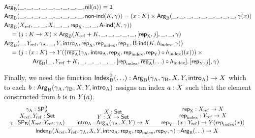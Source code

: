 \documentclass{schwicht}
\begin{document}
\begin{align*} 
&  \mathsf{Arg}_{\mathrm{B}}(\_, \_, \_, \_, \_, \_, \_, \_, \_, \mathsf{nil}(a)) = \mathbf{1} \\
&  \mathsf{Arg}_{\mathrm{B}} (\_, \_, \_, \_, \_, \_, \_, \_, \_, \mathsf{non}\text{-}\mathsf{ind}(K, \gamma)) 
= (x : K) \times \mathsf{Arg}_{\mathrm{B}}(\_, \_, \_, \_, \_, \_, \_, \_, \_, \gamma(x)) \\
&  \mathsf{Arg}_{\mathrm{B}}(X_{\mathrm{ref}}, \_, \_, X, \_, \_, \mathsf{rep}_{\mathrm{X}}, \_, \_, \mathsf{A}\text{-}\mathsf{ind}(K, \gamma)) \\
&\quad=  (j : K \to X) \times \mathsf{Arg}_{\mathrm{B}}(X_{\mathrm{ref}} + K, \_, \_, \_, \_, \_,  [\mathsf{rep}_{\mathrm{X}}, j], \_, \_, \gamma) \\
&  \mathsf{Arg}_{\mathrm{B}}(\_, Y_{\mathrm{ref}}, \gamma_{\mathrm{A}}, \_, Y, \mathsf{intro}_{\mathrm{A}}, \mathsf{rep}_{\mathrm{X}}, \mathsf{rep}_{\mathrm{index}}, \mathsf{rep}_{\mathrm{Y}}, \mathsf{B}\text{-}\mathsf{ind}(K, h_{\mathrm{index}}, \gamma)) \\
&\quad= (j : (x : K) \to Y((\overline{\mathsf{rep}_{\mathrm{A}}}(\gamma_{\mathrm{A}}, \mathsf{intro}_{\mathrm{A}}, \mathsf{rep}_{\mathrm{X}}, \mathsf{rep}_{\mathrm{index}}, \mathsf{rep}_{\mathrm{Y}}) \circ h_{\mathrm{index}})(x))) \times {} \\ 
& \qquad\qquad\ \    \mathsf{Arg}_{\mathrm{B}}(\_, Y_{\mathrm{ref}} + K, \_, \_, \_, \_, \_, [\mathsf{rep}_{\mathrm{index}}, \overline{\mathsf{rep}_{\mathrm{A}}}(\ldots) \circ h_{\mathrm{index}}], [\mathsf{rep}_{\mathrm{Y}}, j], \gamma)
\end{align*}


Finally, we need the function $\mathsf{Index}^{0}_{\mathrm{B}}(\ldots) : \mathsf{Arg}_{\mathrm{B}}(\gamma_{\mathrm{A}}, \gamma_{\mathrm{B}}, X, Y,
\mathsf{intro}_{\mathrm{A}}) \to X$ which to each $b : \mathsf{Arg}_{\mathrm{B}}(\gamma_{\mathrm{A}}, \gamma_{\mathrm{B}}, X, Y,
\mathsf{intro}_{\mathrm{A}})$ assigns an index $a : X$ such that the element constructed
from $b$ is in $Y(a)$.
%
\[
\resizebox{\textwidth}{!}{%
$
\infer{\IndexB(\Xref, \Yref, \gammaA, \A, \B, \introA, \repA, \repIndex, \repB, \gamma) : \ArgB(\ldots) \to \A}
             {\deduce{\gamma : \SPB(\Xref, \Yref, \gammaA)}
                     {\deduce{\Xref, \Yref : \Set}{\gammaA : \SPAp}}
      & \quad \deduce{\introA : \ArgA(\gammaA, \A, \B) \to \A}
                     {\deduce{\B : \A \to \Set}{\A : \Set}}
              & \quad \deduce{\repB: (x : \Yref) \to \B(\repIndex(x))}
                             {\deduce{\repIndex : \Yref \to \A}
                                     {\repA : \Xref \to \A}}}
$
}
\]
\end{document}
